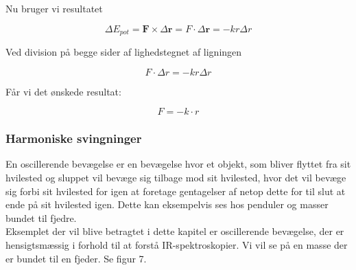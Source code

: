 \documentclass[12pt,a4paper]{article}
\theoremstyle{break}
\theoremstyle{nonumberplain}
\begin{document}
Nu bruger vi resultatet 

\bigskip

\begin{equation}
\Delta E_{pot} = \textbf{F} \times \Delta \textbf{r} = F \cdot \Delta \textbf{r} = -kr \Delta r
\end{equation}

\bigskip

Ved division på begge sider af lighedstegnet af ligningen 

\bigskip

\begin{equation}
F \cdot \Delta r = -kr \Delta r
\end{equation}

\bigskip

Får vi det ønskede resultat: 

\bigskip

\begin{equation}
F = -k \cdot r
\end{equation}

\bigskip

\subsubsection{Harmoniske svingninger}
En oscillerende bevægelse er en bevægelse hvor et objekt, som bliver flyttet fra sit hvilested og sluppet vil bevæge sig tilbage mod sit hvilested, hvor det vil bevæge sig forbi sit hvilested for igen at foretage gentagelser af netop dette for til slut at ende på sit hvilested igen. Dette kan eksempelvis ses hos penduler og masser bundet til fjedre.
\\

Eksemplet der vil blive betragtet i dette kapitel er oscillerende bevægelse, der er hensigtsmæssig i forhold til at forstå IR-spektroskopier. Vi vil se på en masse der er bundet til en fjeder. Se figur 7.

\begin{center}
\end{center}
\end{document}
